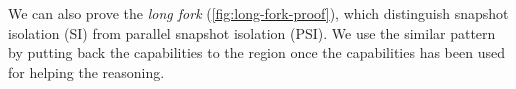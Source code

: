 We can also prove the \emph{long fork} (\cref{fig:long-fork-proof}), 
which distinguish snapshot isolation (SI) from parallel snapshot isolation (PSI).
We use the similar pattern by putting back the capabilities to the region once the capabilities has been used for helping the reasoning.






